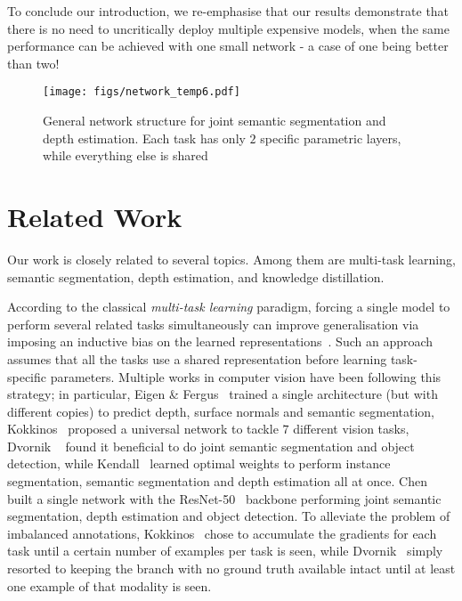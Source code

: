 \documentclass[letterpaper, 10 pt, conference]{ieeeconf}
\begin{document}
To conclude our introduction, we re-emphasise that our results demonstrate that there is no need to uncritically deploy multiple expensive models, when the same performance can be achieved with one small network - a case of one being better than two!

\begin{figure*}
	\centering
	\texttt{[image: figs/network\_temp6.pdf]}
	\caption{General network structure for joint semantic segmentation and depth estimation. Each task has only $2$ specific parametric layers, while everything else is shared}
	\label{fig:arch}
	\vskip -0.2in
\end{figure*}

\section{Related Work}
\label{sec:rel_work}

Our work is closely related to several topics. Among them are multi-task learning, semantic segmentation, depth estimation, and knowledge distillation.

According to the classical {\em multi-task learning} paradigm, forcing a single model to perform several related tasks simultaneously can improve generalisation via imposing an inductive bias on the learned representations~\cite{Caruana93,Baxter00}. Such an approach assumes that all the tasks use a shared representation before learning task-specific parameters. Multiple works in computer vision have been following this strategy; in particular, Eigen \& Fergus~\cite{EigenF15} trained a single architecture (but with different copies) to predict depth, surface normals and semantic segmentation, Kokkinos~\cite{Kokkinos17} proposed a universal network to tackle $7$ different vision tasks, Dvornik ~\etal\cite{DvornikSMS17} found it beneficial to do joint semantic segmentation and object detection, while Kendall~\etal\cite{KendallGC17} learned optimal weights to perform instance segmentation, semantic segmentation and depth estimation all at once. Chen~\etal~\cite{ChenYML18} built a single network with the ResNet-50~\cite{HeZRS16} backbone performing joint semantic segmentation, depth estimation and object detection. To alleviate the problem of imbalanced annotations, Kokkinos~\cite{Kokkinos17} chose to accumulate the gradients for each task until a certain number of examples per task is seen, while Dvornik~\etal \cite{DvornikSMS17} simply resorted to keeping the branch with no ground truth available intact until at least one example of that modality is seen.
\end{document}
